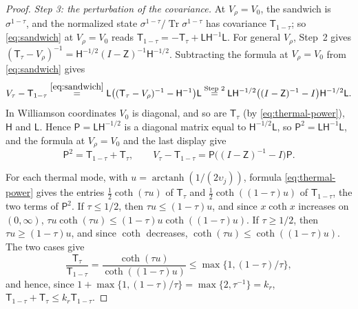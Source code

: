 \documentclass[11pt]{amsart}
\numberwithin{equation}{section}
\theoremstyle{definition}
\newcommand{\Tr}{\operatorname{Tr}}
\newcommand{\arctanh}{\operatorname{arctanh}}
\begin{document}
\begin{proof}
\smallskip
\emph{Step 3: the perturbation of the covariance.} At
\(V_\rho=V_0\), the sandwich is \(\sigma^{1-\tau}\), and the normalized
state \(\sigma^{1-\tau}/{\Tr\sigma^{1-\tau}}\) has covariance
\(\mathsf T_{1-\tau}\); so \eqref{eq:sandwich} at \(V_\rho=V_0\) reads
\(\mathsf T_{1-\tau}=-\mathsf T_\tau+\mathsf L\mathsf H^{-1}\mathsf L\).
For general \(V_\rho\), Step~2 gives
\((\mathsf T_\tau-V_\rho)^{-1}
=\mathsf H^{-1/2}(I-\mathsf Z)^{-1}\mathsf H^{-1/2}\). Subtracting the
formula at \(V_\rho=V_0\) from \eqref{eq:sandwich} gives
\[
 V_\tau-\mathsf T_{1-\tau}
 \overset{\eqref{eq:sandwich}}{=}
 \mathsf L\bigl((\mathsf T_\tau-V_\rho)^{-1}-\mathsf H^{-1}\bigr)\mathsf L
 \overset{\text{Step 2}}{=}
 \mathsf L\mathsf H^{-1/2}\bigl((I-\mathsf Z)^{-1}-I\bigr)
 \mathsf H^{-1/2}\mathsf L.
\]
In Williamson coordinates \(V_0\) is diagonal, and so are
\(\mathsf T_\tau\) (by \eqref{eq:thermal-power}), \(\mathsf H\) and
\(\mathsf L\). Hence \(\mathsf P=\mathsf L\mathsf H^{-1/2}\) is a diagonal
matrix equal to \(\mathsf H^{-1/2}\mathsf L\), so
\(\mathsf P^2=\mathsf L\mathsf H^{-1}\mathsf L\), and the formula at
\(V_\rho=V_0\) and the last display give
\[
 \mathsf P^2=\mathsf T_{1-\tau}+\mathsf T_\tau,\qquad
 V_\tau-\mathsf T_{1-\tau}
 =\mathsf P\bigl((I-\mathsf Z)^{-1}-I\bigr)\mathsf P.
\]

For each thermal mode, with \(u=\arctanh(1/(2\upsilon_j))\), formula
\eqref{eq:thermal-power} gives the entries \(\frac12\coth(\tau u)\) of
\(\mathsf T_\tau\) and \(\frac12\coth((1-\tau)u)\) of
\(\mathsf T_{1-\tau}\), the two terms of \(\mathsf P^2\). If \(\tau\le1/2\), then \(\tau u\le(1-\tau)u\),
and since \(x\coth x\) increases on \((0,\infty)\),
\(\tau u\coth(\tau u)\le(1-\tau)u\coth((1-\tau)u)\). If
\(\tau\ge1/2\), then \(\tau u\ge(1-\tau)u\), and since \(\coth\)
decreases, \(\coth(\tau u)\le\coth((1-\tau)u)\). The two cases give
\[
 \frac{\mathsf T_\tau}{\mathsf T_{1-\tau}}
 =\frac{\coth(\tau u)}{\coth((1-\tau)u)}
 \le\max\{1,(1-\tau)/\tau\},
\]
and hence, since \(1+\max\{1,(1-\tau)/\tau\}=\max\{2,\tau^{-1}\}=k_r\),
\(\mathsf T_{1-\tau}+\mathsf T_\tau\le k_r\mathsf T_{1-\tau}\).


\end{proof}
\end{document}
